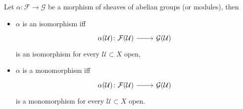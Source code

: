 \documentclass[../Main]{subfiles}
\begin{document}
\begin{prop}
	Let $\alpha\colon \mathcal{F} \to \mathcal{G}$ be a morphism of sheaves 
	of abelian groups (or modules), then
	\begin{itemize}
		\item $\alpha$ is an isomorphism iff
			\begin{equation}
				\begin{tikzcd}
					\alpha(\mathcal{U}) \colon \mathcal{F}(\mathcal{U}) \arrow[r, "", rightarrow] &
				\mathcal{G}(\mathcal{U})
				\end{tikzcd}
			\end{equation} 
			is an isomorphism for every $\mathcal{U} \subset X$ open,
		\item $\alpha$ is a monomorphism iff
			\begin{equation}
				\begin{tikzcd}
					\alpha(\mathcal{U}) \colon \mathcal{F}(\mathcal{U}) \arrow[r, "", rightarrow] &
				\mathcal{G}(\mathcal{U})
				\end{tikzcd}
			\end{equation} 
			is a monomorphism for every $\mathcal{U} \subset X$ open.
	\end{itemize}
\end{prop} 
\end{document}
